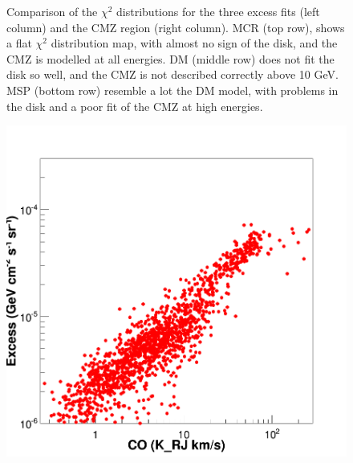 \begin{figure}[H]
\begin{minipage}[h]{0.45\textwidth}
  	\subcaption{}
  	\label{fig:MSP_only_CMZ}
  \end{minipage}
  \caption[$\chi^2$ distributions and CMZ spectra for the MCR, DM and MSP fits.]{Comparison of the $\chi^2$ distributions for the three excess fits (left column) and the CMZ region (right column). MCR (top row), shows a flat $\chi^2$ distribution map, with almost no sign of the disk, and the CMZ is modelled at all energies. DM (middle row) does not fit the disk so well, and the CMZ is not described correctly above 10 GeV. MSP (bottom row) resemble a lot the DM model, with problems in the disk and a poor fit of the CMZ at high energies.}
  \label{fig:Excess_comp_comparison}
\end{figure}

\newpage
\begin{figure}[H]
\centering
  \begin{minipage}[h]{0.7\linewidth}
  	\centering
	\includegraphics[width=1\linewidth]{./pic/results/COvsDM_2_Spectra.png}
  	\subcaption{}
  \label{fig:DM_CO_correlation}
  \end{minipage}
  \hfill
  \begin{minipage}[h]{0.7\linewidth}
  	\centering

\end{minipage}
\end{figure}
